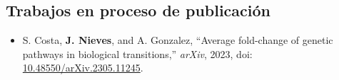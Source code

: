 \subsection*{Trabajos en proceso de publicación}

\begin{itemize}
	\item S. Costa, \textbf{J. Nieves}, and A. Gonzalez, ``Average fold-change of genetic pathways in biological transitions,'' \textit{arXiv}, 2023, doi: \href{https://doi.org/10.48550/arXiv.2305.11245}{10.48550/arXiv.2305.11245}.
\end{itemize}

